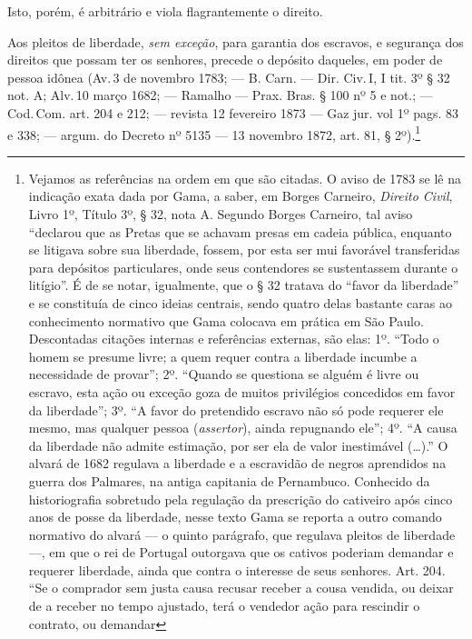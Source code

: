 Isto, porém, é arbitrário e viola flagrantemente o direito.

Aos pleitos de liberdade, \emph{sem exceção}, para garantia dos
escravos, e segurança dos direitos que possam ter os senhores, precede o
depósito daqueles, em poder de pessoa idônea (Av.\,3 de novembro 1783; ---
B. Carn. --- Dir. Civ.\,I, I tit. 3º § 32 not. A; Alv.\,10 março 1682; ---
Ramalho --- Prax. Bras. § 100 nº 5 e not.; --- Cod.\,Com. art. 204 e 212; ---
revista 12 fevereiro 1873 --- Gaz jur. vol 1º pags. 83 e 338; ---
argum. do Decreto nº 5135 --- 13 novembro 1872, art. 81, § 2º).\footnote{
  Vejamos as referências na ordem em que são citadas. O aviso de 1783 se
  lê na indicação exata dada por Gama, a saber, em Borges Carneiro,
  \emph{Direito Civil}, Livro 1º, Título 3º, § 32, nota A. Segundo
  Borges Carneiro, tal aviso ``declarou que as Pretas que se achavam
  presas em cadeia pública, enquanto se litigava sobre sua liberdade,
  fossem, por esta ser mui favorável transferidas para depósitos
  particulares, onde seus contendores se sustentassem durante o
  litígio''. É de se notar, igualmente, que o § 32 tratava do ``favor da
  liberdade'' e se constituía de cinco ideias centrais, sendo quatro
  delas bastante caras ao conhecimento normativo que Gama colocava em
  prática em São Paulo. Descontadas citações internas e referências
  externas, são elas: 1º. ``Todo o homem se presume livre; a quem requer
  contra a liberdade incumbe a necessidade de provar''; 2º.
  ``Quando se questiona se alguém é livre ou escravo, esta ação ou
  exceção goza de muitos privilégios concedidos em favor da liberdade'';
  3º. ``A favor do pretendido escravo não só pode requerer ele mesmo, mas
  qualquer pessoa (\emph{assertor}), ainda repugnando ele''; 4º. ``A causa
  da liberdade não admite estimação, por ser ela de valor inestimável
  (\ldots{}).'' O alvará de 1682 regulava a liberdade e a escravidão de negros
  aprendidos na guerra dos Palmares, na antiga capitania de Pernambuco.
  Conhecido da historiografia sobretudo pela regulação da prescrição do
  cativeiro após cinco anos de posse da liberdade, nesse texto Gama se
  reporta a outro comando normativo do alvará --- o quinto parágrafo, que
  regulava pleitos de liberdade ---, em que o rei de Portugal outorgava que
  os cativos poderiam demandar e requerer liberdade, ainda que contra o
  interesse de seus senhores. Art. 204. ``Se o comprador sem justa causa
  recusar receber a cousa vendida, ou deixar de a receber no tempo
  ajustado, terá o vendedor ação para rescindir o contrato, ou demandar
}
